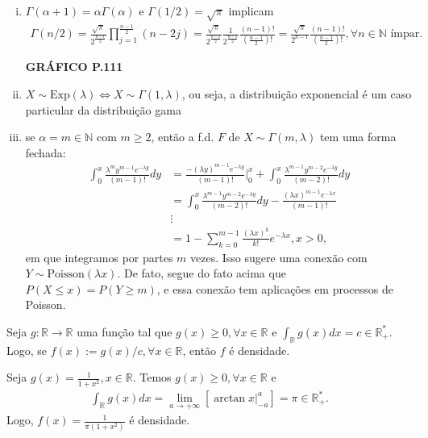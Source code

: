 \documentclass[../Notas.tex]{subfiles}
\begin{document}
\begin{example}
\begin{enumerate}[(i)]
    \item $\Gamma(\alpha + 1) = \alpha\Gamma(\alpha)$ e $\Gamma(1/2) = \sqrt{\pi}$ implicam
    \begin{align*}
        \Gamma(n/2) = \frac{ \sqrt{\pi} }{ 2^{\frac{n-1}{2}} } \prod_{j=1}^{\frac{n-1}{2}} (n-2j) = \frac{ \sqrt{\pi} }{ 2^{\frac{n-1}{2}} }\frac{1}{2^{\frac{n-1}{2}}}\frac{(n-1)!}{\left( \frac{n-1}{2} \right)!} = \frac{ \sqrt{\pi} }{ 2^{n-1} }\frac{(n-1)!}{\left( \frac{n-1}{2} \right)!}, \forall n\in\mathbb{N} \text{ ímpar.}
    \end{align*}
    \begin{center}
        \textbf{GRÁFICO P.111}
    \end{center}
    \item $X\sim\text{Exp}(\lambda)\iff X\sim\Gamma(1, \lambda)$, ou seja, a distribuição exponencial é um caso particular da distribuição gama
    \item se $\alpha = m \in\mathbb{N}$ com $m\geq 2$, então a f.d. $F$ de $X\sim\Gamma(m,\lambda)$ tem uma forma fechada:
    \begin{align*}
        \int_{0}^x \frac{ \lambda^m y^{m-1} e^{-\lambda y} }{(m-1)!} dy &= \frac{ -(\lambda y)^{m-1} e^{-\lambda y} }{(m-1)!}\Big|_{0}^{x} + \int_{0}^x \frac{ \lambda^{m-1} y^{m-2} e^{-\lambda y} }{ (m-2)! } dy \\
        &= \int_{0}^x \frac{ \lambda^{m-1} y^{m-2} e^{-\lambda y} }{ (m-2)! } dy - \frac{ (\lambda x)^{m-1} e^{-\lambda x} }{(m-1)!} \\
        &\vdots \\
        &= 1 - \sum_{k=0}^{m-1} \frac{ (\lambda x)^k }{k!}e^{-\lambda x}, x>0,
    \end{align*}
    em que integramos por partes $m$ vezes. Isso sugere uma conexão com $Y\sim\text{Poisson}(\lambda x)$. De fato, segue do fato acima que $P(X\leq x) = P(Y\geq m)$, e essa conexão tem aplicações em processos de Poisson.
\end{enumerate}
\end{example}

\begin{remark}
Seja $g:\mathbb{R}\to\mathbb{R}$ uma função tal que $g(x)\geq 0, \forall x\in\mathbb{R}$ e $\displaystyle{ \int_{\mathbb{R}} g(x) dx = c\in\mathbb{R}^{*}_{+} }$. Logo, se $f(x) := g(x)/c, \forall x\in\mathbb{R}$, então $f$ é densidade.
\begin{example}
Seja $g(x) = \displaystyle{ \frac{1}{1+x^2}, x\in\mathbb{R} }$. Temos $g(x)\geq 0, \forall x\in\mathbb{R}$ e 
\begin{align*}
    \int_{\mathbb{R}} g(x) dx = \lim_{a\to +\infty} \left[ \arctan x \Big|_{-a}^{a} \right] = \pi\in\mathbb{R}^*_+.
\end{align*}
Logo, $f(x) = \displaystyle{ \frac{1}{\pi(1 + x^2)} }$ é densidade.
\end{example}
\end{remark}
\end{document}

